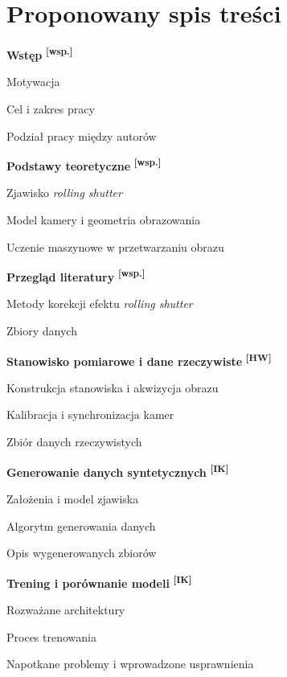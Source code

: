 \documentclass[11pt,a4paper]{article}
\newcommand{\IK}{\textsuperscript{\textbf{[IK]}}}
\newcommand{\HW}{\textsuperscript{\textbf{[HW]}}}
\newcommand{\WS}{\textsuperscript{\textbf{[wsp.]}}}
\begin{document}
\section*{Proponowany spis treści}

\begin{toc}
\item \textbf{Wstęp} \WS
  \begin{toc}
    \item Motywacja
    \item Cel i zakres pracy
    \item Podział pracy między autorów
  \end{toc}

\item \textbf{Podstawy teoretyczne} \WS
  \begin{toc}
    \item Zjawisko \emph{rolling shutter}
    \item Model kamery i geometria obrazowania
    \item Uczenie maszynowe w przetwarzaniu obrazu
  \end{toc}

\item \textbf{Przegląd literatury} \WS
  \begin{toc}
    \item Metody korekcji efektu \emph{rolling shutter}
    \item Zbiory danych
  \end{toc}

\item \textbf{Stanowisko pomiarowe i dane rzeczywiste} \HW
  \begin{toc}
    \item Konstrukcja stanowiska i akwizycja obrazu
    \item Kalibracja i synchronizacja kamer
    \item Zbiór danych rzeczywistych
  \end{toc}

\item \textbf{Generowanie danych syntetycznych} \IK
  \begin{toc}
    \item Założenia i model zjawiska
    \item Algorytm generowania danych
    \item Opis wygenerowanych zbiorów
  \end{toc}

\item \textbf{Trening i porównanie modeli} \IK
  \begin{toc}
    \item Rozważane architektury
    \item Proces trenowania
    \item Napotkane problemy i wprowadzone usprawnienia
  \end{toc}


\end{toc}
\end{document}
